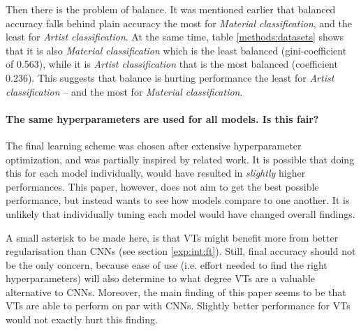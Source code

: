 Then there is the problem of balance. It was mentioned earlier that balanced accuracy falls behind plain accuracy the most for \textit{Material classification}, and the least for \textit{Artist classification}. At the same time, table \ref{methods:datasets} shows that it is also \textit{Material classification} which is the least balanced (gini-coefficient of 0.563), while it is \textit{Artist classification} that is the most balanced (coefficient 0.236). This suggests that balance is hurting performance the least for \textit{Artist classification} -- and the most for \textit{Material classification}.


\paragraph{The same hyperparameters are used for all models. Is this fair?}
The final learning scheme was chosen after extensive hyperparameter optimization, and was partially inspired by related work. It is possible that doing this for each model individually, would have resulted in \textit{slightly} higher performances. This paper, however, does not aim to get the best possible performance, but instead wants to see how models compare to one another. It is unlikely that individually tuning each model would have changed overall findings.

A small asterisk to be made here, is that VTs might benefit more from better regularisation than CNNs (see section \ref{exp:int:ft}). Still, final accuracy should not be the only concern, because ease of use (i.e. effort needed to find the right hyperparameters) will also determine to what degree VTs are a valuable alternative to CNNs. Moreover, the main finding of this paper seems to be that VTs are able to perform on par with CNNs. Slightly better performance for VTs would not exactly hurt this finding.

